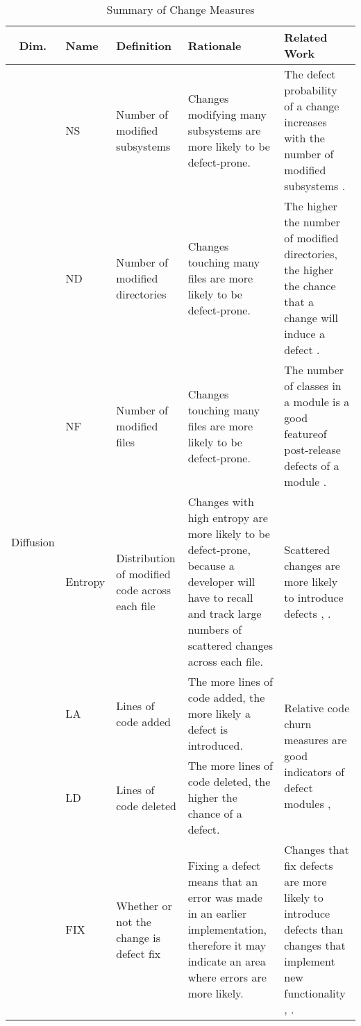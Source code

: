 \documentclass[10pt, conference]{IEEEtran}
\begin{document}
\begin{table}
	\onecolumn
	\centering
	\caption{Summary of Change Measures}
\begin{tabular}{|c|l|p{2.5cm}|p{5.5cm}|p{5.25cm}|}
	\hline Dim. & Name & Definition & Rationale & Related Work \\ 
	\hline \multirow{14}{*}{\begin{sideways}Diffusion\end{sideways}} & NS & Number of modified subsystems  & Changes modifying many subsystems are more likely to be defect-prone. & The defect probability of a change increases with the number of modified subsystems \cite{Mockus2000Bell}. \\ \cline{2-5}  
	 & ND & Number of modified directories & Changes touching many files are more likely to be defect-prone. & The higher the number of modified directories, the higher the chance that a change will induce a defect \cite{Mockus2000Bell}. \\ \cline{2-5}  
	 & NF & Number of modified files & Changes touching many files are more likely to be defect-prone. & The number of classes in a module is a good featureof post-release defects of a module \cite{Nagappan2006ICSE}. \\ \cline{2-5} 
	 & Entropy & Distribution of modified code across each file & Changes with high entropy are more likely to be defect-prone, because a developer will have to recall and track large numbers of scattered changes across each file. & Scattered changes are more likely to introduce defects \cite{DAmbross2010MSR}, \cite{Hassan2009ICSE}. \\ 
	\hline \multirow{4}{*}{\begin{sideways}Size\end{sideways}} & LA & Lines of code added & The more lines of code added, the more likely a defect is introduced. & \multirow{2}{5.25cm}{Relative code churn measures are good indicators of defect modules \cite{Moser2008ICSE}, \cite{Nagappan2005ICSE}}. \\ \cline{2-4} 
	  & LD & Lines of code deleted & The more lines of code deleted, the higher the chance of a defect. &  \\ 
	\hline \multirow{4}{*}{\begin{sideways}Purpose\end{sideways}} & FIX & Whether or not the change is defect fix & Fixing a defect means that an error was made in an earlier implementation, therefore it may indicate an area where errors are more likely. & Changes that fix defects are more likely to introduce defects than changes that implement new functionality \cite{Guo2010ICSE}, \cite{Purushothaman2005IEEE}. \\ 

\end{tabular}
\end{table}
\end{document}
